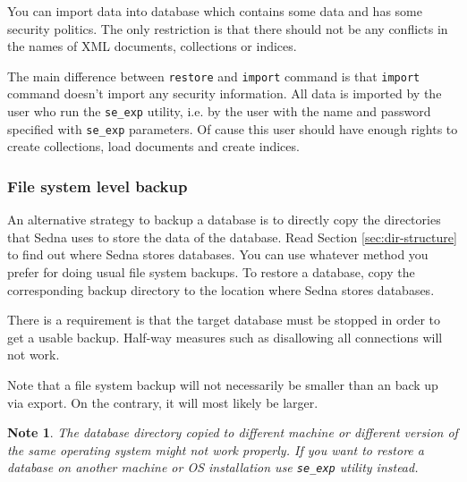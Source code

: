 \documentclass[a4paper,12pt]{article}
\newtheorem{note}{Note}    %
\begin{document}
You can import data into database which contains some data and has some security
politics. The only restriction is that there should not be any conflicts in the
names of XML documents, collections or indices.

The main difference between \verb!restore! and \verb!import! command is that
\verb!import! command doesn't import any security information. All data is
imported by the user who run the \verb!se_exp! utility, i.e. by the user with
the name and password specified with \verb!se_exp! parameters. Of cause this
user should have enough rights to create collections, load documents and create
indices.



\subsubsection{File system level backup}
\label{sec:file-system-level-backup}

An alternative strategy to backup a database is to directly copy the directories
that Sedna uses to store the data of the database. Read Section
\ref{sec:dir-structure} to find out where Sedna stores databases. You can use
whatever method you prefer for doing usual file system backups. To restore a
database, copy the corresponding backup directory to the location where Sedna
stores databases.

There is a requirement is that the target database must be stopped in order to
get a usable backup. Half-way measures such as disallowing all connections will
not work.

Note that a file system backup will not necessarily be smaller than an back up
via export. On the contrary, it will most likely be larger.

\begin{note}
The database directory copied to different machine or different version of the
same operating system might not work properly. If you want to restore a database
on another machine or OS installation use \verb!se_exp! utility instead.
\end{note}


\end{document}

